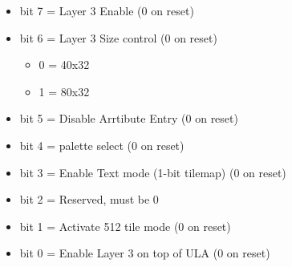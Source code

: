 \begin{itemize}
\item bit 7 = Layer 3 Enable (0 on reset)
\item bit 6 = Layer 3 Size control (0 on reset)
  \begin{itemize}
  \item 0 = 40x32
  \item 1 = 80x32
  \end{itemize}
\item bit 5 = Disable Arrtibute Entry (0 on reset)
\item bit 4 = palette select (0 on reset)
\item bit 3 = Enable Text mode (1-bit tilemap) (0 on reset)
\item bit 2 = Reserved, must be 0
\item bit 1 = Activate 512 tile mode (0 on reset)
\item bit 0 = Enable Layer 3 on top of ULA (0 on reset)
\end{itemize}

